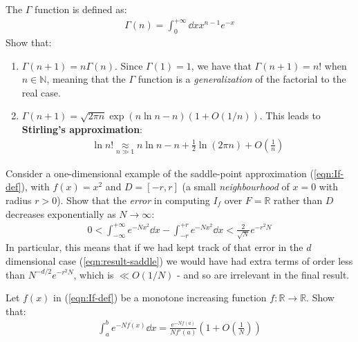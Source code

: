 \documentclass[../template.tex]{subfiles}
\begin{document}
\begin{exo}
    The $\Gamma$ function is defined as:
    \begin{align*}
        \Gamma(n) = \int_0^{+\infty} \dd{x} x^{n-1} e^{-x}
    \end{align*}
    Show that:
    \begin{enumerate}[label=\alph*.]
        \item $\Gamma(n+1) = n \Gamma(n)$. Since $\Gamma(1)=1$, we have that $\Gamma(n+1) = n!$ when $n \in \mathbb{N}$, meaning that the $\Gamma$ function is a \textit{generalization} of the factorial to the real case. 
        \item $\Gamma(n+1) = \sqrt{2 \pi n} \exp(n \ln n-n) (1+O(1/n))$. This leads to \textbf{Stirling's approximation}:
        \begin{align*}
            \ln n! \underset{n \gg 1}{\approx}  n \ln n - n + \frac{1}{2} \ln (2 \pi n) + O\left(\frac{1}{n} \right) 
        \end{align*} 
    \end{enumerate}
\end{exo}

\begin{exo}\label{ex:saddle-domain}
    Consider a one-dimensional example of the saddle-point approximation (\ref{eqn:If-def}), with $f(x) = x^2$ and $D = [-r, r]$ (a small \textit{neighbourhood} of $x=0$ with radius $r > 0$). Show that the \textit{error} in computing $I_f$ over $F = \mathbb{R}$ rather than $D$ decreases exponentially as $N \to \infty$:
    \begin{align*}
        0 < \int_{-\infty}^{+\infty} e^{-N x^2} \dd{x} - \int_{-r}^{+r} e^{-Nx^2} \dd{x} < \frac{2}{\sqrt{N}}  e^{-r^2 N}
    \end{align*}
    In particular, this means that if we had kept track of that error in the $d$ dimensional case (\ref{eqn:result-saddle}) we would have had extra terms of order less than $N^{-d/2} e^{-r^2 N}$, which is $\ll O(1/N)$ - and so are irrelevant in the final result.
\end{exo}

\begin{exo}
    Let $f(x)$ in (\ref{eqn:If-def}) be a monotone increasing function $f\colon \mathbb{R} \to \mathbb{R}$. Show that:
    \begin{align*}
        \int_a^b e^{-N f(x)} \dd{x} = \frac{e^{-N f(a)}}{N f'(a)} \left(1 + O\left(\frac{1}{N} \right)\right)
    \end{align*}
\end{exo}
\end{document}
